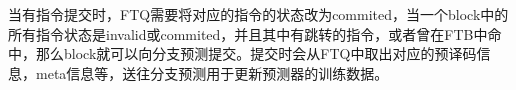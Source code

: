 当有指令提交时，FTQ需要将对应的指令的状态改为commited，当一个block中的所有指令状态是invalid或commited，并且其中有跳转的指令，或者曾在FTB中命中，那么block就可以向分支预测提交。提交时会从FTQ中取出对应的预译码信息，meta信息等，送往分支预测用于更新预测器的训练数据。

















